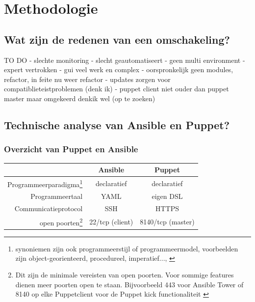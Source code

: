 
\chapter{Methodologie}
\label{ch:methodologie}


\section{Wat zijn de redenen van een omschakeling?}
\label{sec:methodologie-redenen-omschakeling}

TO DO
- slechte monitoring
- slecht geautomatiseert 
- geen multi environment
- expert vertrokken
- gui veel werk en complex
- oorspronkelijk geen modules, refactor, in feite nu weer refactor
- updates zorgen voor compatiblieteistproblemen (denk ik)
- puppet client niet ouder dan puppet master maar omgekeerd denkik wel (op te zoeken)

\section{Technische analyse van Ansible en Puppet?}
\label{sec:methodologie-technische-verschillen}

\subsection{Overzicht van Puppet en Ansible}

\begin{minipage}{15cm}
\begin{tabular}{ r |c c }
& \textbf{Ansible} & \textbf{Puppet} \\
  \hline	  		
Programmeerparadigma\footnote{synoniemen zijn ook programmeerstijl of programmeermodel, voorbeelden zijn object-georienteerd, procedureel, imperatief..., \autocite{journalofinformation} }  & declaratief & declaratief  \\
   \hline
 Programmeertaal & YAML & eigen DSL  \\
     \hline
   Communicatieprotocol & SSH & HTTPS \\
   \hline
   open poorten\footnote{Dit zijn de minimale vereisten van open poorten. Voor sommige features dienen meer poorten open te staan. Bijvoorbeeld 443 voor Ansible Tower of 8140 op elke Puppetclient voor de Puppet kick functionaliteit \autocite{puppetkick} }  & 22/tcp (client) & 8140/tcp (master)\\
  \end{tabular}
  \end{minipage}   



